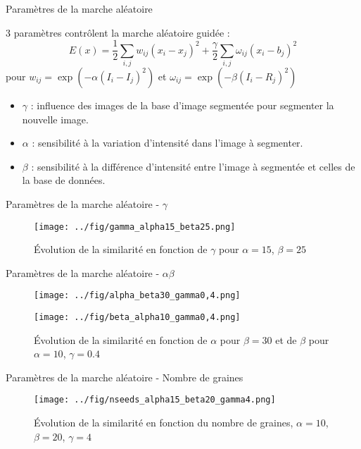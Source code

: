 \documentclass{beamer}
\begin{document}
\begin{frame}{Paramètres de la marche aléatoire}

3 paramètres contrôlent la marche aléatoire guidée :  
$$ E(x)= \frac{1}{2} \sum_{i,j}{w_{ij} (x_i -x_j)^2} + \frac{\gamma}{2} \sum_{i,j}{\omega_{ij} (x_i -b_j)^2}$$
pour $w_{ij} = \exp(-\alpha(I_i-I_j)^2)$ et $\omega_{ij} = \exp(-\beta(I_i-R_j)^2)$

\begin{itemize}
\item $\gamma$ : influence des images de la base d’image segmentée pour segmenter la nouvelle image. 

\item $\alpha$ : sensibilité à la variation d’intensité dans l’image à segmenter.

\item $\beta$ : sensibilité à la différence d’intensité entre l’image à segmentée et celles de la base de données. 
\end{itemize}

\end{frame}


\begin{frame}{Paramètres de la marche aléatoire - $\gamma$}
\begin{figure}[h!]
  \begin{center}
    \caption{Évolution de la similarité en fonction de $\gamma$ pour $\alpha=15$, $\beta=25$}
    \texttt{[image: ../fig/gamma\_alpha15\_beta25.png]}
  \end{center}
\end{figure}
\end{frame}

\begin{frame}{Paramètres de la marche aléatoire - $\alpha \beta$}
  \begin{figure}[h]
    \begin{center}
      \parbox{5cm}{\texttt{[image: ../fig/alpha\_beta30\_gamma0,4.png]}}
      \parbox{5cm}{\texttt{[image: ../fig/beta\_alpha10\_gamma0,4.png]}}
      \caption{Évolution de la similarité en fonction de $\alpha$ pour  $\beta=30$ et de $\beta$ pour $\alpha=10$, $\gamma=0.4$}
    \end{center}
  \end{figure}
\end{frame}


\begin{frame}{Paramètres de la marche aléatoire - Nombre de graines}
\begin{figure}[h!]
  \begin{center}
    \caption{Évolution de la similarité en fonction du nombre de graines, $\alpha=10$, $\beta=20$, $\gamma=4$}
    \texttt{[image: ../fig/nseeds\_alpha15\_beta20\_gamma4.png]}
    \label{fig:nseeds}
  \end{center}
\end{figure}
\end{frame}
\end{document}
